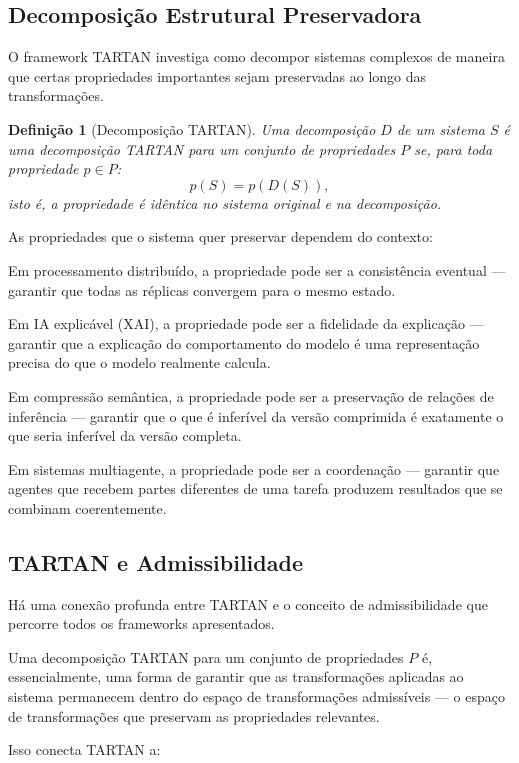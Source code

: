 \documentclass[11pt, a4paper]{article}
\theoremstyle{named}
\newtheorem{definicao}{Definição}
\begin{document}
\subsection{Decomposição Estrutural Preservadora}

O framework TARTAN investiga como decompor sistemas complexos de
maneira que certas propriedades importantes sejam preservadas ao longo
das transformações.

\begin{definicao}[Decomposição TARTAN]
Uma decomposição $D$ de um sistema $S$ é uma decomposição TARTAN
para um conjunto de propriedades $P$ se, para toda propriedade
$p \in P$:
\[
  p(S) = p(D(S)),
\]
isto é, a propriedade é idêntica no sistema original e na decomposição.
\end{definicao}

As propriedades que o sistema quer preservar dependem do contexto:

Em processamento distribuído, a propriedade pode ser a consistência
eventual — garantir que todas as réplicas convergem para o mesmo estado.

Em IA explicável (XAI), a propriedade pode ser a fidelidade da
explicação — garantir que a explicação do comportamento do modelo é
uma representação precisa do que o modelo realmente calcula.

Em compressão semântica, a propriedade pode ser a preservação de
relações de inferência — garantir que o que é inferível da versão
comprimida é exatamente o que seria inferível da versão completa.

Em sistemas multiagente, a propriedade pode ser a coordenação —
garantir que agentes que recebem partes diferentes de uma tarefa
produzem resultados que se combinam coerentemente.

\subsection{TARTAN e Admissibilidade}

Há uma conexão profunda entre TARTAN e o conceito de admissibilidade
que percorre todos os frameworks apresentados.

Uma decomposição TARTAN para um conjunto de propriedades $P$ é,
essencialmente, uma forma de garantir que as transformações aplicadas
ao sistema permanecem dentro do espaço de transformações admissíveis
— o espaço de transformações que preservam as propriedades relevantes.

Isso conecta TARTAN a:
\end{document}
